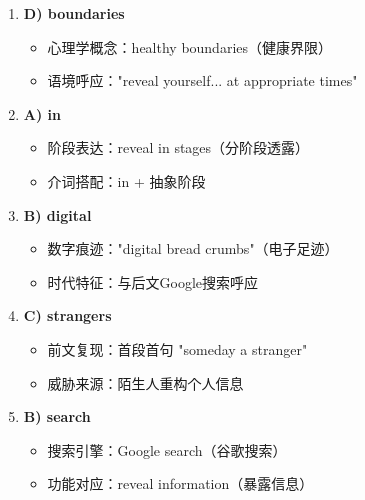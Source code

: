 \documentclass{article}
\begin{document}
\begin{enumerate}[label=\textbf{\arabic*.}]
    \item \textbf{D) boundaries} 
    \begin{itemize}
        \item 心理学概念：healthy boundaries（健康界限）
        \item 语境呼应："reveal yourself... at appropriate times"
    \end{itemize}
    
    \item \textbf{A) in} 
    \begin{itemize}
        \item 阶段表达：reveal in stages（分阶段透露）
        \item 介词搭配：in + 抽象阶段
    \end{itemize}
    
    \item \textbf{B) digital} 
    \begin{itemize}
        \item 数字痕迹："digital bread crumbs"（电子足迹）
        \item 时代特征：与后文Google搜索呼应
    \end{itemize}
    
    \item \textbf{C) strangers} 
    \begin{itemize}
        \item 前文复现：首段首句 "someday a stranger"
        \item 威胁来源：陌生人重构个人信息
    \end{itemize}
    
    \item \textbf{B) search} 
    \begin{itemize}
        \item 搜索引擎：Google search（谷歌搜索）
        \item 功能对应：reveal information（暴露信息）
    \end{itemize}
\end{enumerate}
\end{document}
